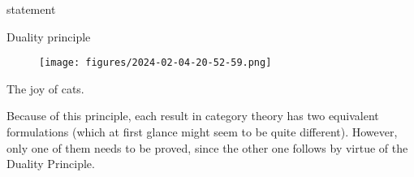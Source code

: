 \begin{theorem}[on isomorphisms]
    statement
\end{theorem}


\begin{definition}
    
\end{definition}

\begin{definition}
    
\end{definition}


\begin{definition}
    
\end{definition}



    


Duality principle

\begin{figure}[!htb]
    \centering
    \texttt{[image: figures/2024-02-04-20-52-59.png]}
    \caption{}%
\end{figure}

The joy of cats.

Because of this principle, each result in category theory has two equivalent formulations
(which at first glance might seem to be quite different). However, only one of them needs
to be proved, since the other one follows by virtue of the Duality Principle.